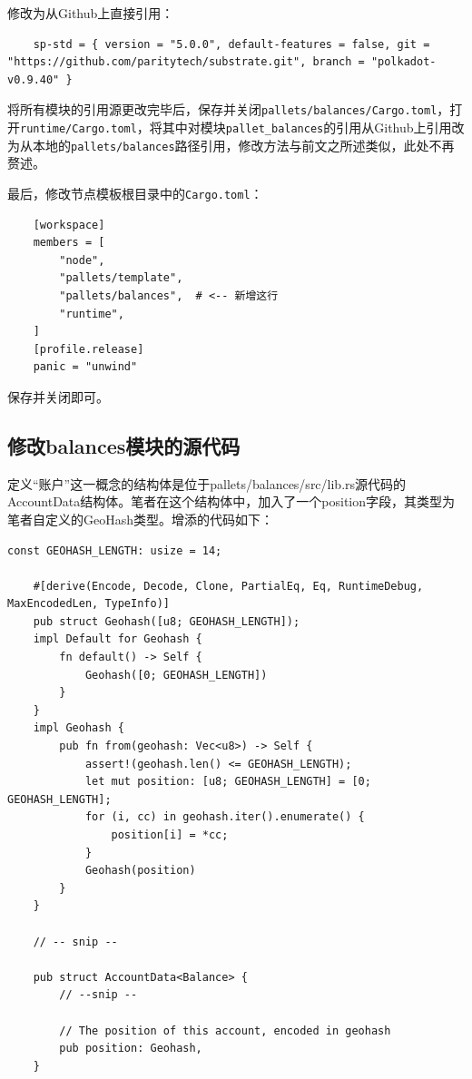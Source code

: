 修改为从Github上直接引用：

\begin{lstlisting}
    sp-std = { version = "5.0.0", default-features = false, git = "https://github.com/paritytech/substrate.git", branch = "polkadot-v0.9.40" }
\end{lstlisting}

将所有模块的引用源更改完毕后，保存并关闭\verb|pallets/balances/Cargo.toml|，打开\verb|runtime/Cargo.toml|，将其中对模块\verb|pallet_balances|的引用从Github上引用改为从本地的\verb|pallets/balances|路径引用，修改方法与前文之所述类似，此处不再赘述。

最后，修改节点模板根目录中的\verb|Cargo.toml|：

\begin{lstlisting}
    [workspace]
    members = [
        "node",
        "pallets/template",
        "pallets/balances",  # <-- 新增这行
        "runtime",
    ]
    [profile.release]
    panic = "unwind"
\end{lstlisting}

保存并关闭即可。

\subsection{修改balances模块的源代码}

定义“账户”这一概念的结构体是位于pallets/balances/src/lib.rs源代码的AccountData结构体。笔者在这个结构体中，加入了一个position字段，其类型为笔者自定义的GeoHash类型。增添的代码如下：

\begin{lstlisting}[caption={为balances模块新增代码}]
    const GEOHASH_LENGTH: usize = 14;

    #[derive(Encode, Decode, Clone, PartialEq, Eq, RuntimeDebug, MaxEncodedLen, TypeInfo)]
    pub struct Geohash([u8; GEOHASH_LENGTH]);
    impl Default for Geohash {
        fn default() -> Self {
            Geohash([0; GEOHASH_LENGTH])
        }
    }
    impl Geohash {
        pub fn from(geohash: Vec<u8>) -> Self {
            assert!(geohash.len() <= GEOHASH_LENGTH);
            let mut position: [u8; GEOHASH_LENGTH] = [0; GEOHASH_LENGTH];
            for (i, cc) in geohash.iter().enumerate() {
                position[i] = *cc;
            }
            Geohash(position)
        }
    }

    // -- snip --

    pub struct AccountData<Balance> {
        // --snip --

        // The position of this account, encoded in geohash
        pub position: Geohash,
    }
\end{lstlisting}

